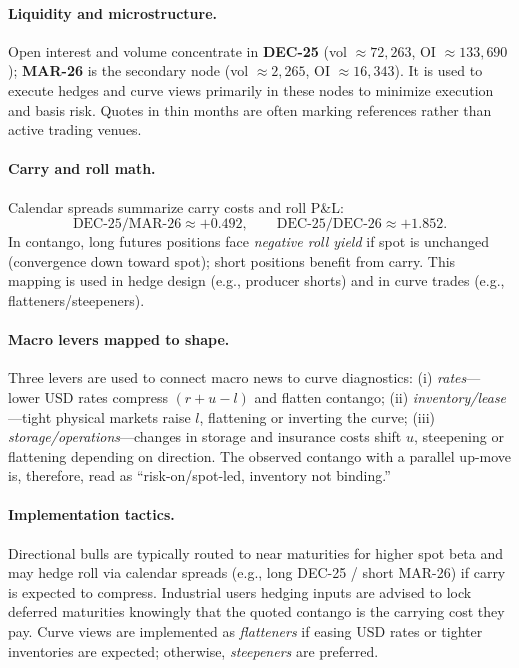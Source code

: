 \documentclass[10pt,a4paper]{article} %
\begin{document}
\paragraph{Liquidity and microstructure.}
Open interest and volume concentrate in \textbf{DEC-25} (vol \(\approx 72{,}263\), OI \(\approx 133{,}690\)); \textbf{MAR-26} is the secondary node (vol \(\approx 2{,}265\), OI \(\approx 16{,}343\)). It is used to execute hedges and curve views primarily in these nodes to minimize execution and basis risk. Quotes in thin months are often marking references rather than active trading venues.

\paragraph{Carry and roll math.}
Calendar spreads summarize carry costs and roll P\&L:
\[
\text{DEC-25/MAR-26} \approx +0.492,\qquad \text{DEC-25/DEC-26} \approx +1.852.
\]
In contango, long futures positions face \emph{negative roll yield} if spot is unchanged (convergence down toward spot); short positions benefit from carry. This mapping is used in hedge design (e.g., producer shorts) and in curve trades (e.g., flatteners/steepeners).

\paragraph{Macro levers mapped to shape.}
Three levers are used to connect macro news to curve diagnostics: (i) \emph{rates}—lower USD rates compress \((r+u-l)\) and flatten contango; (ii) \emph{inventory/lease}—tight physical markets raise \(l\), flattening or inverting the curve; (iii) \emph{storage/operations}—changes in storage and insurance costs shift \(u\), steepening or flattening depending on direction. The observed contango with a parallel up-move is, therefore, read as “risk-on/spot-led, inventory not binding.”

\paragraph{Implementation tactics.}
Directional bulls are typically routed to near maturities for higher spot beta and may hedge roll via calendar spreads (e.g., long DEC-25 / short MAR-26) if carry is expected to compress. Industrial users hedging inputs are advised to lock deferred maturities knowingly that the quoted contango is the carrying cost they pay. Curve views are implemented as \emph{flatteners} if easing USD rates or tighter inventories are expected; otherwise, \emph{steepeners} are preferred.
\end{document}
